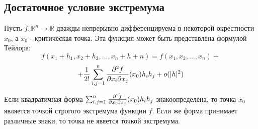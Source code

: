 \subsection{Достаточное условие экстремума}
Пусть $f: \mathbb{R}^n \to \mathbb{R}$ дважды непрерывно дифференцируема в некоторой окрестности $x_0$, а $x_0$ - критическая точка. Эта функция может быть представлена формулой Тейлора:
$$f(x_1+h_1,x_2+h_2,...,x_n+h+n)= f(x_1,x_2,...,x_n)+$$
$$+ {1 \over 2!} \sum_{i,j=1}^{n}{{\partial^2 f \over \partial x_i \partial x_j}(x_0)h_i h_j} + o(|h|^2)$$
\begin{theorem}
Если квадратичная форма $\sum_{i,j=1}^{n}{{\partial^2 f \over \partial x_i \partial x_j}(x_0)h_i h_j}$ знакоопределена, то точка $x_0$ является точкой строгого экстремума функции $f$. Если же форма принимает различные знаки, то точка не явяется точкой экстремума.
\end{theorem}
